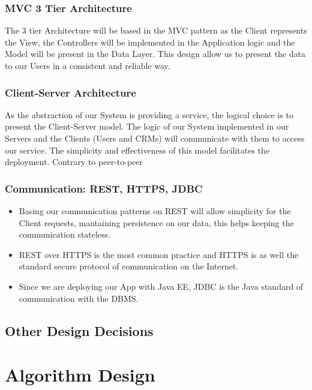 \documentclass[a4paper]{article}
\begin{document}
\subsubsection{MVC 3 Tier Architecture}
The 3 tier Architecture will be based in the MVC pattern as the Client represents the View, the Controllers will be implemented in the Application logic and the Model will be present in the Data Layer. This design allow us to present the data to our Users in a consistent and reliable way.
\subsubsection{Client-Server Architecture}
As the abstraction of our System is providing a service, the logical choice is to present the Client-Server model. The logic of our System implemented in our Servers and the Clients (Users and CRMs) will communicate with them to access our service. The simplicity and effectiveness of this model facilitates the deployment. Contrary to peer-to-peer 
\newpage
\subsubsection{Communication: REST, HTTPS, JDBC}
\begin{itemize}
\item Basing our communication patterns on REST will allow simplicity for the Client requests, mantaining persistence on our data, this helps keeping the communication stateless. 
\item  REST over HTTPS is the most common practice and HTTPS is as well the standard secure protocol of communication on the Internet. 
\item Since we are deploying our App with Java EE, JDBC is the Java standard of communication with the DBMS.
\end{itemize}

\subsection{Other Design Decisions}

\newpage
\section{Algorithm Design}

\newpage
\end{document}
